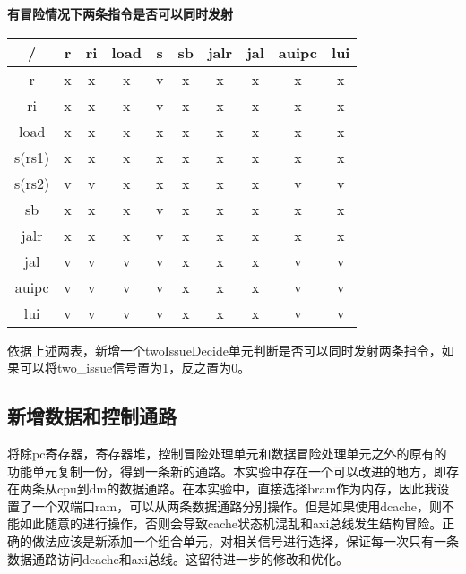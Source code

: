 \documentclass{article}
\begin{document}
\begin{center}
        \vspace{20pt}
        \par{\bf 有冒险情况下两条指令是否可以同时发射}
        \par{}
        \begin{tabular}{|c|c|c|c|c|c|c|c|c|c|}
            \hline
                / & r & ri & load & s & sb & jalr & jal & auipc & lui \\
            \hline
                r & x & x & x & v & x & x & x & x & x \\
            \hline
                ri & x & x & x & v & x & x & x & x & x \\
            \hline
                load & x & x & x & x & x & x & x & x & x \\
            \hline
                s(rs1) & x & x & x & x & x & x & x & x & x \\
            \hline
                s(rs2) & v & v & x & x & x & x & x & v & v \\
            \hline
                sb & x & x & x & v & x & x & x & x & x \\
            \hline
                jalr & x & x & x & v & x & x & x & x & x \\
            \hline
                jal & v & v & v & v & x & x & x & v & v \\
            \hline
                auipc & v & v & v & v & x & x & x & v & v \\
            \hline
                lui & v & v & v & v & x & x & x & v & v \\
            \hline
        \end{tabular}
        \end{center}
        \par{}
        依据上述两表，新增一个twoIssueDecide单元判断是否可以同时发射两条指令，如果可以将two\_issue信号置为1，反之置为0。
        
        \subsection{新增数据和控制通路}
        将除pc寄存器，寄存器堆，控制冒险处理单元和数据冒险处理单元之外的原有的功能单元复制一份，得到一条新的通路。本实验中存在一个可以改进的地方，即存在两条从cpu到dm的数据通路。在本实验中，直接选择bram作为内存，因此我设置了一个双端口ram，可以从两条数据通路分别操作。但是如果使用dcache，则不能如此随意的进行操作，否则会导致cache状态机混乱和axi总线发生结构冒险。正确的做法应该是新添加一个组合单元，对相关信号进行选择，保证每一次只有一条数据通路访问dcache和axi总线。这留待进一步的修改和优化。
\end{document}

